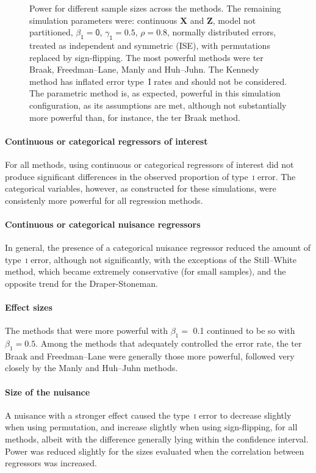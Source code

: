\begin{figure}[!p]
\centering
\caption{Power for different sample sizes across the methods. The remaining simulation parameters were: continuous $\mathbf{X}$ and $\mathbf{Z}$, model not partitioned, $\mathsf{\beta_1=0}$, $\mathsf{\gamma_1=0.5}$, $\mathsf{\rho=0.8}$, normally distributed errors, treated as independent and symmetric ({\scriptsize ISE}), with permutations replaced by sign-flipping. The most powerful methods were ter Braak, Freedman--Lane, Manly and Huh--Juhn. The Kennedy method has inflated error type~I rates and should not be considered. The parametric method is, as expected, powerful in this simulation configuration, as its assumptions are met, although not substantially more powerful than, for instance, the ter Braak method.}
\label{fig:simulations-np}
\end{figure}

\paragraph{Continuous or categorical regressors of interest} For all methods, using continuous or categorical regressors of interest did not produce significant differences in the observed proportion of type~\textsc{i} error. The categorical variables, however, as constructed for these simulations, were consistenly more powerful for all regression methods.

\paragraph{Continuous or categorical nuisance regressors} In general, the presence of a categorical nuisance regressor reduced the amount of type~\textsc{i} error, although not significantly, with the exceptions of the Still--White method, which became extremely conservative (for small samples), and the opposite trend for the Draper-Stoneman.

\paragraph{Effect sizes} The methods that were more powerful with $\beta_1=$ 0.1 continued to be so with $\beta_1=\text{0.5}$. Among the methods that adequately controlled the error rate, the ter Braak and Freedman--Lane were generally those more powerful, followed very closely by the Manly and Huh--Juhn methods.

\paragraph{Size of the nuisance} A nuisance with a stronger effect caused the type~\textsc{i} error to decrease slightly when using permutation, and increase slightly when using sign-flipping, for all methods, albeit with the difference generally lying within the confidence interval. Power was reduced slightly for the sizes evaluated when the correlation between regressors was increased.


